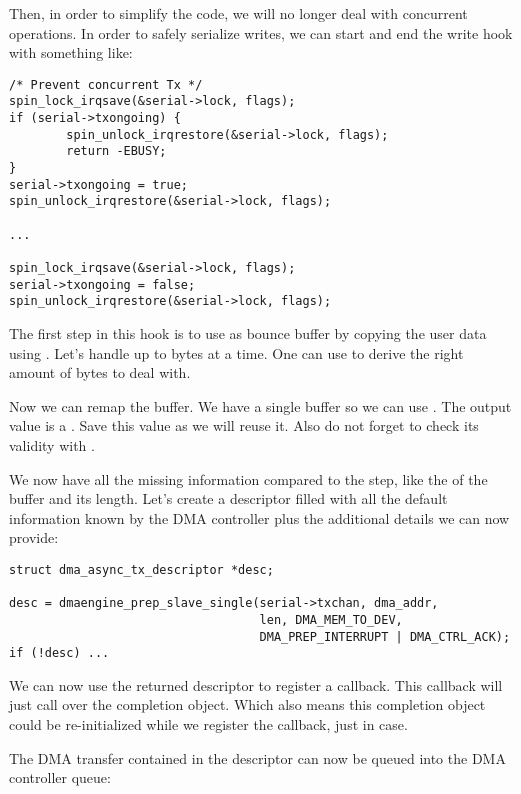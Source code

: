 Then, in order to simplify the code, we will no longer deal with
concurrent operations. In order to safely serialize writes, we can start
and end the write hook with something like:

\begin{verbatim}
/* Prevent concurrent Tx */
spin_lock_irqsave(&serial->lock, flags);
if (serial->txongoing) {
        spin_unlock_irqrestore(&serial->lock, flags);
        return -EBUSY;
}
serial->txongoing = true;
spin_unlock_irqrestore(&serial->lock, flags);

...

spin_lock_irqsave(&serial->lock, flags);
serial->txongoing = false;
spin_unlock_irqrestore(&serial->lock, flags);
\end{verbatim}

The first step in this  hook is to use  as
bounce buffer by copying the user data using . Let's
handle up to  bytes at a time. One can use 
to derive the right amount of bytes to deal with.

Now we can remap the buffer. We have a single buffer so we can use
. The output value is a . Save this
value as we will reuse it. Also do not forget to check its validity with
.

We now have all the missing information compared to the 
step, like the  of the buffer and its length. Let's create a
descriptor filled with all the default information known by the DMA controller
plus the additional details we can now provide:

\begin{verbatim}
struct dma_async_tx_descriptor *desc;

desc = dmaengine_prep_slave_single(serial->txchan, dma_addr,
                                   len, DMA_MEM_TO_DEV,
                                   DMA_PREP_INTERRUPT | DMA_CTRL_ACK);
if (!desc) ...
\end{verbatim}

We can now use the returned descriptor to register a callback. This callback
will just call  over the completion object. Which also means
this completion object could be re-initialized while we register the callback,
just in case.

The DMA transfer contained in the descriptor can now be queued into the DMA
controller queue:


